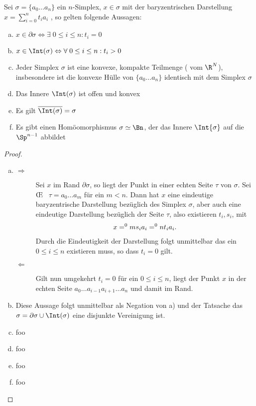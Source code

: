 \begin{Satz}
  \normalfont Sei $\sigma = \{ a_0 \ldots a_n \}$ ein $n$-Simplex,
  $x \in \sigma$ mit der baryzentrischen Darstellung
  $x=\sum\limits_{i=0}^n t_i a_i$ , so gelten folgende Aussagen:
  \begin{enumerate}[(a)]
  \item
    $x \in \partial\sigma \Leftrightarrow \exists \; 0 \leq i \leq n :
    t_i = 0$
  \item
    $x \in \Int(\sigma) \Leftrightarrow \forall \; 0 \leq i \leq n :
    t_i > 0$
  \item Jeder Simplex $\sigma$ ist eine konvexe, kompakte Teilmenge (
    vom $\R^N$), insbesondere ist die konvexe Hülle von
    $\{ a_0 \ldots a_n \}$ identisch mit dem Simplex $\sigma$
  \item Das Innere $\Int(\sigma)$ ist offen und konvex
  \item Es gilt $\overline{\Int(\sigma)} = \sigma$
  \item Es gibt einen Homöomorphismus $\sigma \simeq \Bn$, der das
    Innere $\Int{\sigma}$ auf die $\Sp^{n-1}$ abbildet
  \end{enumerate}
  \begin{proof}
	\begin{enumerate}[a):]
		\item 
		\begin{description}
		\item[\glqq $\Rightarrow$\grqq] Sei $x$ im Rand $\partial\sigma$, so liegt der Punkt in einer echten Seite $\tau$ von $\sigma$. Sei \OE~ $\tau = a_0 \ldots a_m$ für ein $m < n$. Dann hat $x$ eine eindeutige baryzentrische Darstellung bezüglich des Simplex $\sigma$, aber auch eine eindeutige Darstellung bezüglich der Seite $\tau$, also existieren $t_i,s_i$, mit
		\begin{gather*}
			x = \sp{0}{m} s_i a_i = \sp{0}{n} t_i a_i .
		\end{gather*}
		Durch die Eindeutigkeit der Darstellung folgt unmittelbar das ein 
		$0 \leq i \leq n$ existieren muss, so dass $t_i = 0$ gilt.
		\item[\glqq $\Leftarrow$ \grqq] Gilt nun umgekehrt $t_i = 0$ für
			ein $0 \leq i \leq n$, liegt der Punkt $x$ in der echten Seite $a_0 \ldots a_{i-1} a_{i+1} \ldots a_n$ und damit im Rand.
		\end{description}
		\item Diese Aussage folgt unmittelbar als Negation von a) und 
			der Tatsache das $\sigma = \partial\sigma \cup \Int(\sigma)$
			eine disjunkte Vereinigung ist.
		\item foo
		\item foo
		\item foo
		\item foo
 	\end{enumerate}
  \end{proof}
\end{Satz}

